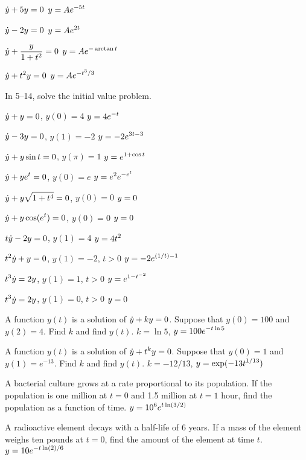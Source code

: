 \exercise $\displaystyle\dot y+5y=0$
\answer $\displaystyle y=Ae^{-5t}$
\endanswer
\endexercise

\exercise $\displaystyle\dot y-2y=0$
\answer $\displaystyle y=Ae^{2t}$
\endanswer
\endexercise

\exercise $\displaystyle\dot y+{y\over 1+t^2}=0$
\answer $\displaystyle y=Ae^{-\arctan t}$
\endanswer
\endexercise

\exercise $\displaystyle\dot y+t^2y=0$
\answer $\displaystyle y=Ae^{-t^3/3}$
\endanswer

In 5--14, solve the initial value problem.
\endexercise

\exercise $\displaystyle\dot y + y=0$, $y(0)=4$
\answer $\displaystyle y=4e^{-t}$
\endanswer
\endexercise

\exercise $\displaystyle\dot y -3y=0$, $y(1)=-2$
\answer $\displaystyle y=-2e^{3t-3}$
\endanswer
\endexercise

\exercise $\displaystyle\dot y + y\sin t = 0$, $y(\pi)=1$
\answer $\displaystyle y=e^{1+\cos t}$
\endanswer
\endexercise

\exercise $\displaystyle\dot y +ye^t=0$, $y(0)=e$
\answer $\displaystyle y=e^2e^{-e^t}$
\endanswer
\endexercise

\exercise $\displaystyle\dot y +y\sqrt{1+t^4}=0$, $y(0)=0$
\answer $\displaystyle y=0$
\endanswer
\endexercise

\exercise $\displaystyle\dot y + y\cos(e^t)=0$, $y(0)=0$
\answer $\displaystyle y=0$
\endanswer
\endexercise

\exercise $\displaystyle t\dot y - 2y = 0$, $y(1)=4$
\answer $\displaystyle y=4t^2$
\endanswer
\endexercise

\exercise $\displaystyle t^2\dot y + y = 0$, $y(1)=-2$, $t>0$
\answer $\displaystyle y=-2e^{(1/t)-1}$
\endanswer
\endexercise

\exercise $\displaystyle t^3\dot y = 2y$, $y(1)=1$, $t>0$
\answer $\displaystyle y=e^{1-t^{-2}}$
\endanswer
\endexercise

\exercise $\displaystyle t^3\dot y = 2y$, $y(1)=0$, $t>0$
\answer $\displaystyle y=0$
\endanswer

\endexercise

\exercise A function $y(t)$ is a solution of $\displaystyle\dot y +
ky=0$. Suppose that $y(0)=100$ and $y(2)=4$. Find $k$ and find $y(t)$.
\answer $k=\ln 5$, $\displaystyle y=100e^{-t\ln 5}$
\endanswer
\endexercise

\exercise A function $y(t)$ is a solution of $\displaystyle\dot y +
t^ky=0$. Suppose that $y(0)=1$ and $y(1)=e^{-13}$. Find $k$ and find
$y(t)$. 
\answer $k=-12/13$, $\displaystyle y=\exp(-13 t^{1/13})$
\endanswer
\endexercise

\exercise A bacterial culture grows at a rate proportional to its
population. If the population is one million at $t=0$ and 1.5
million at $t=1$ hour, find the population as a function of time.
\answer $\displaystyle y=10^6e^{t\ln(3/2)}$
\endanswer
\endexercise

\exercise A radioactive element decays with a half-life of 6 years. If
a mass of the element weighs ten pounds at $t=0$, find the amount of
the element at time $t$.
\answer $\displaystyle y=10e^{-t\ln(2)/6}$
\endanswer
\endexercise

\endexercises

